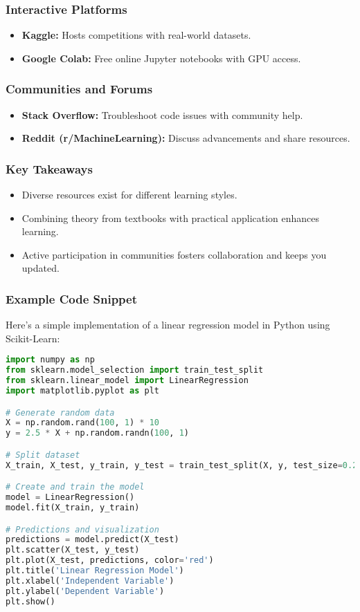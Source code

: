 \documentclass{beamer}
\begin{document}
\begin{frame}
    \frametitle{Interactive Platforms}
    \begin{itemize}
        \item \textbf{Kaggle:} Hosts competitions with real-world datasets.
        \item \textbf{Google Colab:} Free online Jupyter notebooks with GPU access.
    \end{itemize}
\end{frame}

\begin{frame}
    \frametitle{Communities and Forums}
    \begin{itemize}
        \item \textbf{Stack Overflow:} Troubleshoot code issues with community help.
        \item \textbf{Reddit (r/MachineLearning):} Discuss advancements and share resources.
    \end{itemize}
\end{frame}

\begin{frame}
    \frametitle{Key Takeaways}
    \begin{itemize}
        \item Diverse resources exist for different learning styles.
        \item Combining theory from textbooks with practical application enhances learning.
        \item Active participation in communities fosters collaboration and keeps you updated.
    \end{itemize}
\end{frame}

\begin{frame}[fragile]
    \frametitle{Example Code Snippet}
    Here’s a simple implementation of a linear regression model in Python using Scikit-Learn:
    
    \begin{lstlisting}[language=Python]
import numpy as np
from sklearn.model_selection import train_test_split
from sklearn.linear_model import LinearRegression
import matplotlib.pyplot as plt

# Generate random data
X = np.random.rand(100, 1) * 10
y = 2.5 * X + np.random.randn(100, 1)

# Split dataset
X_train, X_test, y_train, y_test = train_test_split(X, y, test_size=0.2)

# Create and train the model
model = LinearRegression()
model.fit(X_train, y_train)

# Predictions and visualization
predictions = model.predict(X_test)
plt.scatter(X_test, y_test)
plt.plot(X_test, predictions, color='red')
plt.title('Linear Regression Model')
plt.xlabel('Independent Variable')
plt.ylabel('Dependent Variable')
plt.show()
    \end{lstlisting}
\end{frame}
\end{document}
